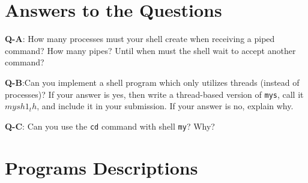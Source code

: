 





\maketitle

%
%
%
%
%



\section{Answers to the Questions}
\textbf{Q-A}: How many processes must your shell create when receiving a piped command? How many pipes? Until when must the shell wait to accept another command? \newline


\textbf{Q-B}:Can you implement a shell program which only utilizes threads (instead of processes)? If your answer is yes, then write a thread-based version of \texttt{mys}, call it \texttt{$mysh1_th$}, and include it in your submission. If your answer is no, explain why. \newline


\textbf{Q-C}: Can you use the \texttt{cd} command with shell \texttt{my}? Why?


\section{Programs Descriptions}
